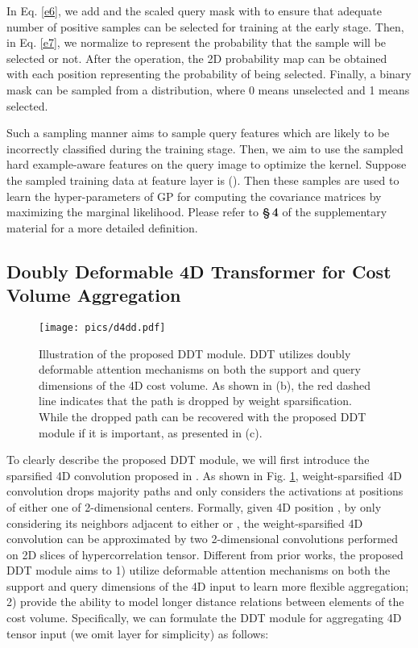 \documentclass[runningheads]{llncs}
\begin{document}
In Eq. \ref{e6}, we add  and the scaled query mask  with  to ensure that adequate number of positive samples can be selected for training at the early stage. Then, in Eq. \ref{e7}, we normalize  to represent the probability that the sample will be selected or not.
After the  operation, the 2D probability map  can be obtained with each position representing the probability of being selected. Finally, a binary mask  can be sampled from a  distribution, where 0 means unselected and 1 means selected.

Such a sampling manner aims to sample query features which are likely to be incorrectly classified during the training stage. Then, we aim to use the sampled hard example-aware features on the query image to optimize the kernel. Suppose the sampled  training data at feature layer  is  (). Then these samples are used to learn the hyper-parameters  of GP for computing the covariance matrices by maximizing the marginal likelihood. Please refer to \textbf{\S\,4} of the supplementary material for a more detailed definition.

\subsection{Doubly Deformable 4D Transformer for Cost Volume Aggregation}
\begin{figure}[t]
	\centering
	\texttt{[image: pics/d4dd.pdf]}
	\caption{Illustration of the proposed DDT module. DDT utilizes doubly deformable attention mechanisms on both the support and query dimensions of the 4D cost volume. As shown in (b), the red dashed line indicates that the path is dropped by weight sparsification. While the dropped path can be recovered with the proposed DDT module if it is important, as presented in (c).}
	\label{d4dd}
\end{figure} 

To clearly describe the proposed DDT module, we will first introduce the sparsified 4D convolution proposed in \cite{min2021hypercorrelation}. As shown in Fig. \ref{d4dd}, weight-sparsified 4D convolution drops majority paths and only considers the activations at positions of either one of 2-dimensional centers. Formally, given 4D position , by only considering its neighbors adjacent to either  or , the weight-sparsified 4D convolution can be approximated by two 2-dimensional convolutions performed on 2D slices of hypercorrelation tensor.
Different from prior works, the proposed DDT module aims to 1) utilize deformable attention mechanisms \cite{xia2022vision,zhu2020deformable} on both the support and query dimensions of the 4D input to learn more flexible aggregation; 2) provide the ability to model longer distance relations between elements of the cost volume. Specifically, we can formulate the DDT module for aggregating 4D tensor input  (we omit layer  for simplicity) as follows:
\end{document}
